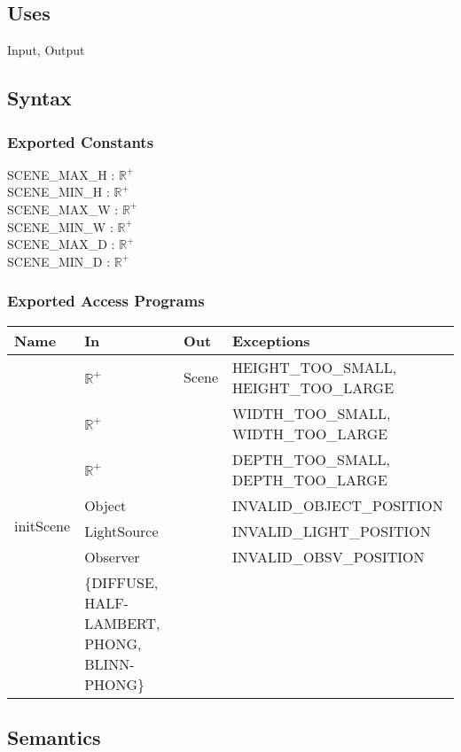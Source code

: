 \documentclass[12pt, titlepage]{article}
\begin{document}
\subsection{Uses}
Input, Output

\subsection{Syntax}
\subsubsection{Exported Constants}
SCENE\_MAX\_H : $\mathbb{R}^+$\\
SCENE\_MIN\_H : $\mathbb{R}^+$\\
SCENE\_MAX\_W : $\mathbb{R}^+$\\
SCENE\_MIN\_W : $\mathbb{R}^+$\\
SCENE\_MAX\_D : $\mathbb{R}^+$\\
SCENE\_MIN\_D : $\mathbb{R}^+$\\
\subsubsection{Exported Access Programs}
\begin{center}
	\begin{tabular}{p{2cm} p{4cm} p{2cm} p{4cm}}
		\hline
		\textbf{Name} & \textbf{In} & \textbf{Out} & \textbf{Exceptions} \\
		\hline
		\multirow{7}{4cm}{initScene} & $\mathbb{R}^+$ & Scene & 
		HEIGHT\_TOO\_SMALL, 
		HEIGHT\_TOO\_LARGE\\
		& $\mathbb{R}^+$ & & WIDTH\_TOO\_SMALL, 
		WIDTH\_TOO\_LARGE\\		
		& $\mathbb{R}^+$ & & DEPTH\_TOO\_SMALL, 
		DEPTH\_TOO\_LARGE\\				 
		& Object & & INVALID\_OBJECT\_POSITION\\				 
		& LightSource & & INVALID\_LIGHT\_POSITION\\
		& Observer & & INVALID\_OBSV\_POSITION\\
		& \{DIFFUSE, HALF-LAMBERT, PHONG, BLINN-PHONG\} & & \\
		
		\hline
	\end{tabular}
\end{center}

\subsection{Semantics}
\end{document}

